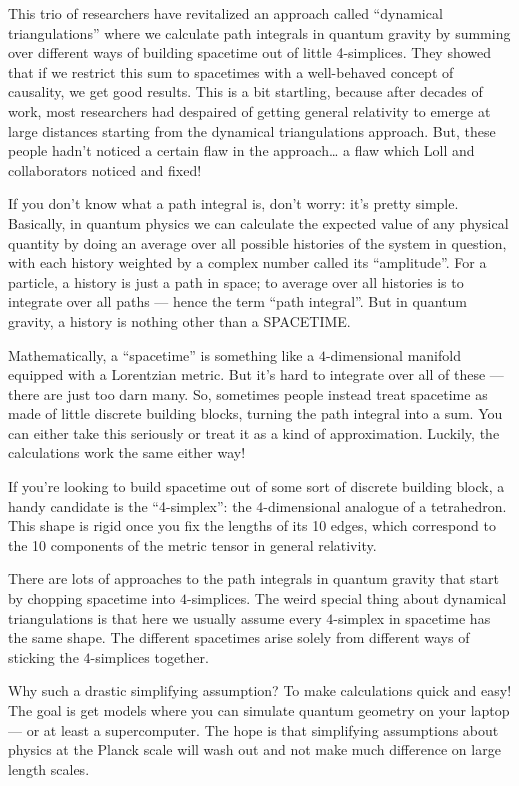 \documentclass{article}
\begin{document}
This trio of researchers have revitalized an approach called ``dynamical
triangulations'' where we calculate path integrals in quantum gravity by
summing over different ways of building spacetime out of little
4-simplices. They showed that if we restrict this sum to spacetimes with
a well-behaved concept of causality, we get good results. This is a bit
startling, because after decades of work, most researchers had despaired
of getting general relativity to emerge at large distances starting from
the dynamical triangulations approach. But, these people hadn't noticed
a certain flaw in the approach\ldots{} a flaw which Loll and
collaborators noticed and fixed!

If you don't know what a path integral is, don't worry: it's pretty
simple. Basically, in quantum physics we can calculate the expected
value of any physical quantity by doing an average over all possible
histories of the system in question, with each history weighted by a
complex number called its ``amplitude''. For a particle, a history is
just a path in space; to average over all histories is to integrate over
all paths --- hence the term ``path integral''. But in quantum gravity,
a history is nothing other than a SPACETIME.

Mathematically, a ``spacetime'' is something like a \(4\)-dimensional
manifold equipped with a Lorentzian metric. But it's hard to integrate
over all of these --- there are just too darn many. So, sometimes people
instead treat spacetime as made of little discrete building blocks,
turning the path integral into a sum. You can either take this seriously
or treat it as a kind of approximation. Luckily, the calculations work
the same either way!

If you're looking to build spacetime out of some sort of discrete
building block, a handy candidate is the ``4-simplex'': the
\(4\)-dimensional analogue of a tetrahedron. This shape is rigid once
you fix the lengths of its 10 edges, which correspond to the 10
components of the metric tensor in general relativity.

There are lots of approaches to the path integrals in quantum gravity
that start by chopping spacetime into \(4\)-simplices. The weird special
thing about dynamical triangulations is that here we usually assume
every \(4\)-simplex in spacetime has the same shape. The different
spacetimes arise solely from different ways of sticking the
\(4\)-simplices together.

Why such a drastic simplifying assumption? To make calculations quick
and easy! The goal is get models where you can simulate quantum geometry
on your laptop --- or at least a supercomputer. The hope is that
simplifying assumptions about physics at the Planck scale will wash out
and not make much difference on large length scales.
\end{document}
